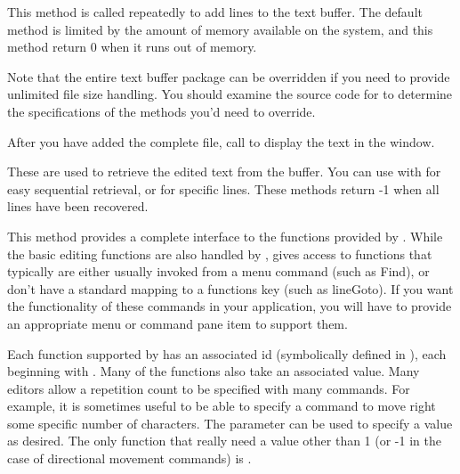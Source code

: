 
This method is called repeatedly to add lines to the
text buffer. The default method is limited by the amount
of memory available on the system, and this method
return 0 when it runs out of memory.

Note that the entire text buffer package can be overridden
if you need to provide unlimited file size handling. You
should examine the source code for  to
determine the specifications of the methods you'd need
to override.


After you have added the complete file, call 
to display the text in the window.


These are used to retrieve the edited text from the buffer.
You can use  with  for
easy sequential retrieval, or  for specific
lines. These methods return -1 when all lines have been
recovered.


This method provides a complete interface to the functions
provided by . While the basic
editing functions are also handled by ,
 gives access to functions that typically
are either usually invoked from a menu command (such as
Find), or don't have a standard mapping to a functions
key (such as lineGoto). If you want the functionality of
these commands in your application, you will have to
provide an appropriate menu or command pane item to
support them.

Each function supported by  has an
associated id (symbolically defined in ), each
beginning with . Many of
the functions also take an associated value. Many editors
allow a repetition count to be specified with many commands.
For example, it is sometimes useful to be able to specify
a command to move right some specific number of characters.
The  parameter can be used to specify a value
as desired. The only function that really need a value
other than 1 (or -1 in the case of directional movement
commands) is .


